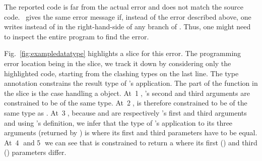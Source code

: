 

%
%
The reported code is far from the actual error and does not match the
source code.
\SMLNJ\ gives the same error message if, instead of the error described
above, one writes  instead of  in
the right-hand-side of any branch of .
Thus, one might need to inspect the entire program to find the error.



Fig.~\ref{fig:exampledatatype} highlights a slice for this error.
%
The programming error location being in the slice, we track it down by
considering only the highlighted code,
starting from the clashing types on the last line.  The type annotation
 constrains the result type of
's application.
The part of the  function in the slice is the
case handling a  object.
At~\textcircled{1},
's second and third arguments are constrained to
be of the same type.
At~\textcircled{2},  is therefore
constrained to be of the same type as .
At~\textcircled{3}, because  and 
are respectively 's first and third arguments
and using 's definition, we infer that
the type of 's application to its three
arguments (returned by ) is
 where its first
and third
parameters have to be equal.
%
At~\textcircled{4} and \textcircled{5} we can see that
 is constrained to return a 
where its first () and third ()
parameters differ.

